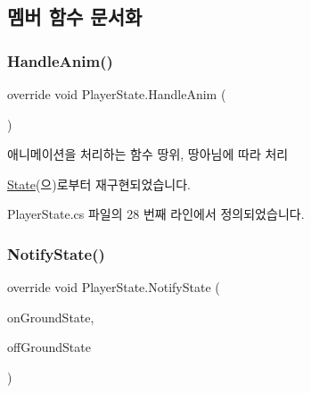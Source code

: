 \subsection{멤버 함수 문서화}
\mbox{\label{class_player_state_ae57c0c11c946d701bb1e0eb2bc7204dd}} 
\subsubsection{\texorpdfstring{HandleAnim()}{HandleAnim()}}
{\footnotesize\ttfamily override void Player\+State.\+Handle\+Anim (\begin{DoxyParamCaption}{ }\end{DoxyParamCaption})\hspace{0.3cm}{\ttfamily [virtual]}}



애니메이션을 처리하는 함수\textquotesingle{} 땅위, 땅아님에 따라 처리 



\mbox{\hyperlink{class_state_aa064ec6cd84d4a09b2c72a536125c74b}{State}}(으)로부터 재구현되었습니다.



Player\+State.\+cs 파일의 28 번째 라인에서 정의되었습니다.


\begin{DoxyCode}{0}

\end{DoxyCode}
\mbox{\label{class_player_state_a59f3f64c24ba1b6e34e34cb23746ecb0}} 
\subsubsection{\texorpdfstring{NotifyState()}{NotifyState()}}
{\footnotesize\ttfamily override void Player\+State.\+Notify\+State (\begin{DoxyParamCaption}\item[{\mbox{\hyperlink{class_state_ab9eb1c1d81f1903b8486d1275e78b68e}{On\+Ground}}}]{on\+Ground\+State,  }\item[{\mbox{\hyperlink{class_state_a7d945e793324c017a973205564cf1a56}{Off\+Ground}}}]{off\+Ground\+State }\end{DoxyParamCaption})\hspace{0.3cm}{\ttfamily [virtual]}}



